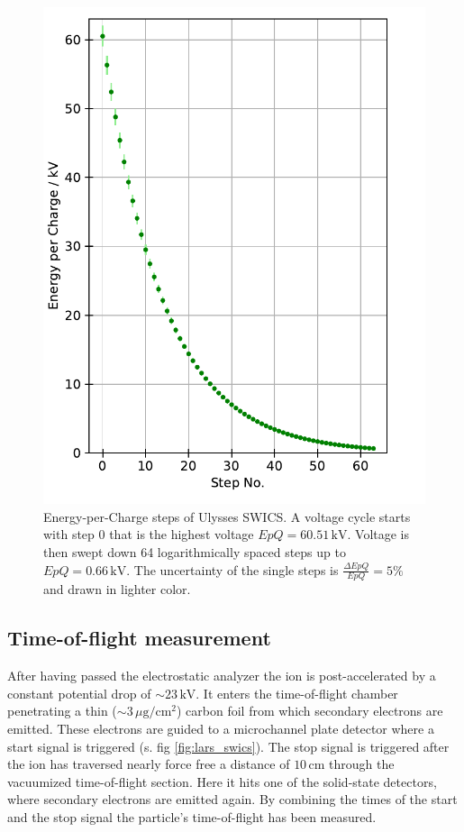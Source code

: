 %
\begin{figure}[h]
		\centering
		\includegraphics[scale = 0.7]{Figures/epq_err.pdf}
		\caption{Energy-per-Charge steps of Ulysses SWICS. A voltage cycle starts with step 0 that is the highest voltage $EpQ = 60.51\, \mathrm{kV}$. Voltage is then swept down 64 logarithmically spaced steps up to $EpQ = 0.66\, \mathrm{kV}$. The uncertainty of the single steps is $\frac{\Delta EpQ}{EpQ} = 5\%$ and drawn in lighter color.
		} \label{fig:epq}
\end{figure}
%
%
%
\subsection{Time-of-flight measurement}
After having passed the electrostatic analyzer the ion is post-accelerated by a constant potential drop of $\sim 23\,\mathrm{kV}$. It enters the time-of-flight chamber penetrating a thin ($\sim 3\,\mu \mathrm{g / cm^2}$) carbon foil from which secondary electrons are emitted. These electrons are guided to a microchannel plate detector where a start signal is triggered (s. fig \ref{fig:lars_swics}). The stop signal is triggered after the ion has traversed nearly force free a distance of $10\,\mathrm{cm}$ through the vacuumized time-of-flight section. Here it hits one of the solid-state detectors, where secondary electrons are emitted again. By combining the times of the start and the stop signal the particle's time-of-flight has been measured.
